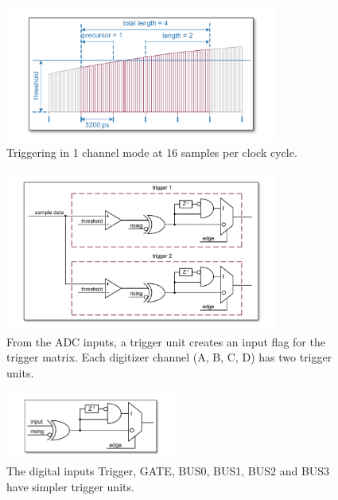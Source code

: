 		\begin{figure}[ht]
			\begin{center}
				\includegraphics[width=0.8\textwidth]{figures/1ChannelTriggering.pdf}
				\caption{Triggering in 1 channel mode at 16 samples per clock cycle.\label{fig:1ChannelTriggering}}
			\end{center}
		\end{figure}
		
		\begin{figure}[hb]
			\begin{center}
				\includegraphics[width=0.8\textwidth]{figures/analog-trigger.pdf}
				\caption{From the ADC inputs, a trigger unit creates an input flag for the trigger matrix. Each digitizer channel (A, B, C, D) has two trigger units.\label{fig:analog-trigger}}
			\end{center}
		\end{figure}
	
		\begin{figure}[ht]
			\begin{center}
				\includegraphics[width=0.5\textwidth]{figures/DigitalInput.pdf}
				\caption{The digital inputs Trigger, GATE, BUS0, BUS1, BUS2 and BUS3 have simpler trigger units.\label{fig:DigitalInput}}
			\end{center}
		\end{figure}
		
